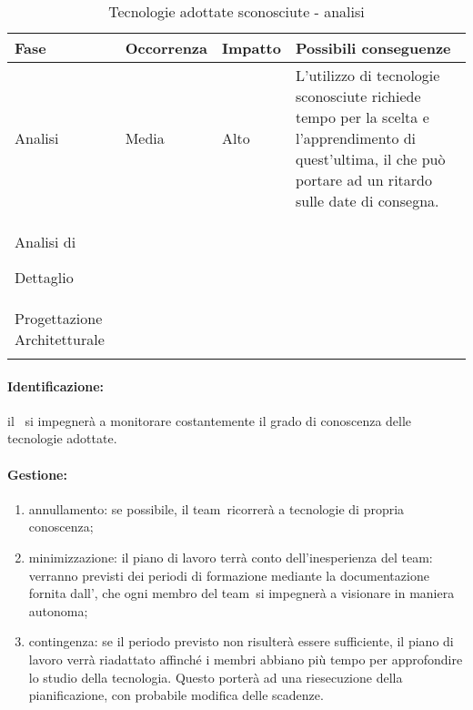 \documentclass[../PianoProgetto.tex]{subfiles}
\begin{document}
	\begin{table}[h]
		\centering
		\begin{tabularx}{\textwidth}{F O O P}
			\toprule
			\textbf{Fase} & \textbf{Occorrenza} & \textbf{Impatto} & \textbf{Possibili conseguenze}\\
			\midrule
			Analisi & Media & Alto & L'utilizzo di tecnologie sconosciute richiede tempo per la scelta e l'apprendimento di quest'ultima, il che può portare ad un ritardo sulle date di consegna. \\
			\midrule
			Analisi di \par Dettaglio & & & \\
			\midrule
			Progettazione Architetturale & & & \\
			\bottomrule
		\end{tabularx}
		\caption{Tecnologie adottate sconosciute - analisi}
		\label{tab:Tecnologie adottate sconosciute - analisi}	
	\end{table} 
	
	\paragraph*{Identificazione:} il \responsabilediprogetto\ si impegnerà a monitorare costantemente il grado di conoscenza delle tecnologie adottate.	
	
	\paragraph*{Gestione:}
	\begin{enumerate}
		\item annullamento: se possibile, il team\g\ ricorrerà a tecnologie di propria conoscenza;
		\item minimizzazione: il piano di lavoro terrà conto dell'inesperienza del team\g : verranno previsti dei periodi di formazione mediante la documentazione fornita dall'\amministratore , che ogni membro del team\g\ si impegnerà a visionare in maniera autonoma;
		\item contingenza: se il periodo previsto non risulterà essere sufficiente, il piano di lavoro verrà riadattato affinché i membri abbiano più tempo per approfondire lo studio della tecnologia. Questo porterà ad una riesecuzione della pianificazione, con probabile modifica delle scadenze.
	\end{enumerate}
	
\end{document}
